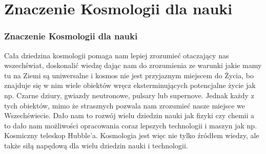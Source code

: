 \section{Znaczenie Kosmologii dla nauki}
\begin{frame}
\frametitle{Znaczenie Kosmologii dla nauki}
Cała dziedzina kosmologii pomaga nam lepiej zrozumieć otaczający nas wszechświat, doskonalić wiedzę dając nam do zrozumienia ze warunki jakie mamy tu na Ziemi są uniwersalne i kosmos nie jest przyjaznym miejscem do Życia, bo znajduje się w nim wiele obiektów wręcz eksterminujących potencjalne życie jak np. Czarne dziury, gwiazdy neutronowe, pulsary lub supernove. Jednak każdy z tych obiektów, mimo że strasznych pozwala nam zrozumieć nasze miejsce we Wszechświecie. Dało nam to rozwój wielu dziedzin nauki jak fizyki czy chemii a to dało nam możliwości opracowania coraz lepszych technologii i maszyn jak np. Kosmiczny teleskop Hubble’a. Kosmologia jest więc nie tylko źródłem wiedzy, ale także siłą napędową dla wielu dziedzin nauki i technologii. 
\end{frame}